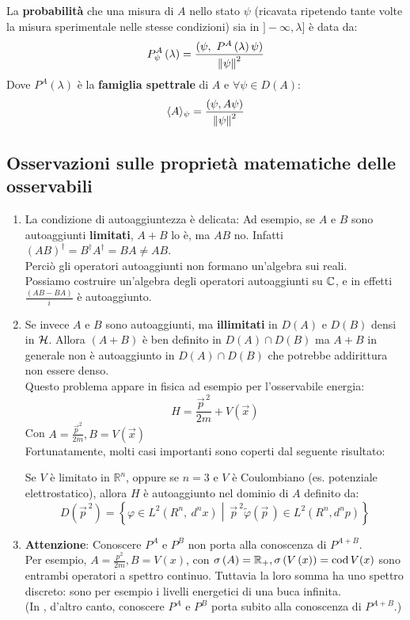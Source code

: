 \documentclass[../../FisicaTeorica.tex]{subfiles}
\begin{document}
\begin{axi}
La \textbf{probabilità} che una misura di $A$ nello stato $\psi$ (ricavata ripetendo tante volte la misura sperimentale nelle stesse condizioni) sia in $]-\infty , \lambda]$ è data da:
\[
P_\psi^A\left(\lambda\right)=\frac{(\psi,\ P^A\left(\lambda\right)\psi)}{\norm{\psi}^2}
\]
Dove $P^A\left(\lambda\right)$ è la \textbf{famiglia spettrale} di $A$ e $\forall \psi \in D\left(A\right)$:
\[
\langle A \rangle_\psi = \frac{(\psi, A\psi)}{\left\lVert\psi\right\rVert^2}
\]
\end{axi}

\subsection{Osservazioni sulle proprietà matematiche delle osservabili}
\begin{enumerate}
    \item La condizione di autoaggiuntezza è delicata: 
	Ad esempio, se $A$ e $B$ sono autoaggiunti \textbf{limitati}, $A+B$ lo è, ma $AB$ no. Infatti $\left(AB\right)^\dag=B^\dag A^\dag=BA\neq AB$.\\
	Perciò gli operatori autoaggiunti non formano un'algebra sui reali.\\
	Possiamo costruire un'algebra degli operatori autoaggiunti su $\mathbb{C}$, e in effetti $\frac{\left(AB-BA\right)}{i}$ è autoaggiunto.
	\item Se invece $A$ e $B$ sono autoaggiunti, ma \textbf{illimitati} in $D\left(A\right)$ e $D(B)$ densi in $\mathcal{H}$. Allora $(A+B)$ è ben definito in $D\left(A\right)\cap D\left(B\right)$ ma $A+B$ in generale non è autoaggiunto in $D\left(A\right)\cap D\left(B\right)$ che potrebbe addirittura non essere denso.\\
	Questo problema appare in fisica ad esempio per l'osservabile energia:
	\[
	H=\frac{{\vec{p}}^{\,2}}{2m}+V(\vec{x})
	\]
	Con $A=\frac{{\vec{p}}^2}{2m}, B=V(\vec{x})$\\
	Fortunatamente, molti casi importanti sono coperti dal seguente risultato:
	\begin{thm}
	Se $V$ è limitato in $\mathbb{R}^n$, oppure se $n=3$ e $V$ è Coulombiano (es. potenziale elettrostatico), allora $H$ è autoaggiunto nel dominio di $A$ definito da:
	    \[
	    D\left(\vec{p}^{\>2}\right)=\left\{\varphi\in L^2\left(R^n,\ d^nx\right)\middle|\ {\vec{p}}^{\>2}\widetilde{\varphi}\left(\vec{p}\,\right)\in L^2\left(R^n, d^np\right)\right\}
	    \]
	\end{thm}
	\item \textbf{Attenzione}: Conoscere $P^A$ e $P^B$ non porta alla conoscenza di $P^{A+B}$.\\
	Per esempio, $A=\frac{p^2}{2m}, B=V\left(x\right)$, con $\sigma \left(A\right)= \mathbb{R}_+, \sigma \left(V\left(x\right)\right)=\operatorname{cod} V(x)$ sono entrambi operatori a spettro continuo. Tuttavia la loro somma ha uno spettro discreto: sono per esempio i livelli energetici di una buca infinita.\\
	(In \MC, d'altro canto, conoscere $P^A$ e $P^B$ porta subito alla conoscenza di $P^{A+B}$.)\\
\end{enumerate}
\end{document}
